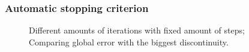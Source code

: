 \begin{frame}
    \frametitle{Automatic stopping criterion}
    \begin{figure}[ht]
        \centering
        \scalebox{0.8}{}
        \caption{Different amounts of iterations with fixed amount of steps; Comparing global error with the biggest discontinuity.}
    \label{fig:error_disc}
    \end{figure}
\end{frame}